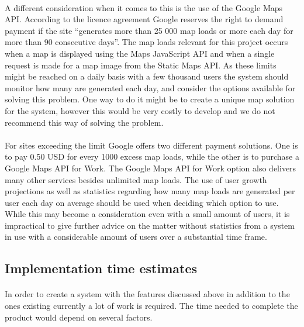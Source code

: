 \paragraph{} A different consideration when it comes to this is the use of the Google Maps API. According to the licence agreement Google reserves the right to demand payment if the site “generates more than 25 000 map loads or more each day for more than 90 consecutive days”. The map loads relevant for this project occurs when a map is displayed using the Maps JavaScript API and when a single request is made for a map image from the Static Maps API. As these limits might be reached on a daily basis with a few thousand users the system should monitor how many are generated each day, and consider the options available for solving this problem. One way to do it might be to create a unique map solution for the system, however this would be very costly to develop and we do not recommend this way of solving the problem.
\paragraph{} For sites exceeding the limit Google offers two different payment solutions. One is to pay 0.50 USD for every 1000 excess map loads, while the other is to purchase a Google Maps API for Work. The Google Maps API for Work option also delivers many other services besides unlimited map loads. The use of user growth projections as well as statistics regarding how many map loads are generated per user each day on average should be used when deciding which option to use. While this may become a consideration even with a small amount of users, it is impractical to give further advice on the matter without statistics from a system in use with a considerable amount of users over a substantial time frame. \cite{website:maps-api-docs-usage,website:maps-api-faq}

\subsection{Implementation time estimates}
\label{subsec:FurtherRequiredEstimate}

\paragraph{} In order to create a system with the features discussed above in addition to the ones existing currently a lot of work is required. The time needed to complete the product would depend on several factors. 
